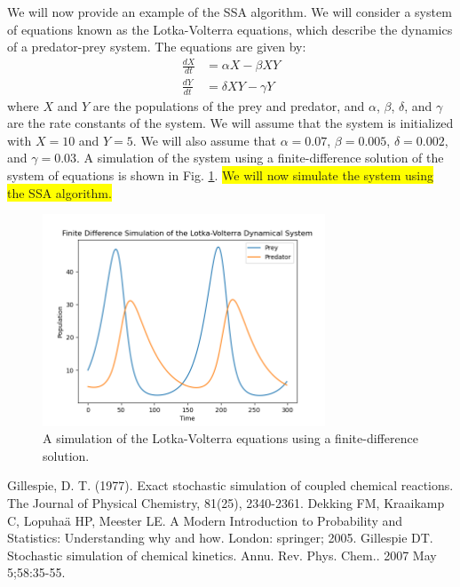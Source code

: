 \documentclass[12pt]{article}
\begin{document}
We will now provide an example of the SSA algorithm.  We will consider a system of equations known as the Lotka-Volterra equations, which describe the dynamics of a predator-prey system. The equations are given by:
\begin{align}
\frac{dX}{dt} &= \alpha X - \beta XY \\
\frac{dY}{dt} &= \delta XY - \gamma Y
\label{eq:LV}
\end{align}
where $X$ and $Y$ are the populations of the prey and predator, and $\alpha$, $\beta$, $\delta$, and $\gamma$ are the rate constants of the system.  We will assume that the system is initialized with $X=10$ and $Y=5$. We will also assume that $\alpha=0.07$, $\beta=0.005$, $\delta=0.002$, and $\gamma=0.03$. A simulation of the system using a finite-difference solution of the system of equations is shown in Fig. \ref{fig:LV}.  
\colorbox{yellow}{We will now simulate the system using the SSA algorithm.}
\begin{figure}
\centering
\includegraphics[width=0.75\textwidth]{Lotka-Volterra.png}
\caption{A simulation of the Lotka-Volterra equations using a finite-difference solution.}
\label{fig:LV}
\end{figure}
\begin{thebibliography}{9}
Gillespie, D. T. (1977). Exact stochastic simulation of coupled chemical reactions. The Journal of Physical Chemistry, 81(25), 2340-2361.
Dekking FM, Kraaikamp C, Lopuhaä HP, Meester LE. A Modern Introduction to Probability and Statistics: Understanding why and how. London: springer; 2005.
Gillespie DT. Stochastic simulation of chemical kinetics. Annu. Rev. Phys. Chem.. 2007 May 5;58:35-55.
\end{thebibliography}
\end{document}
